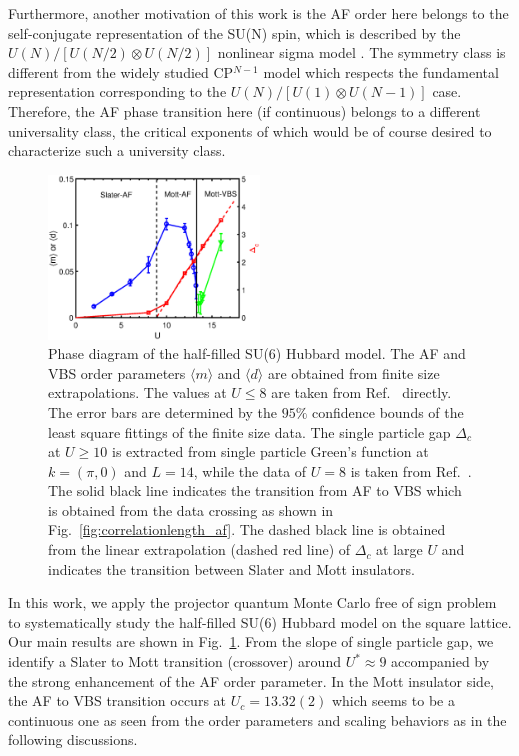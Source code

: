 \documentclass[twocolumn,superscriptaddress,prb]{revtex4-1}
\begin{document}
Furthermore, another motivation of this work is the AF order here belongs to the self-conjugate representation of the SU(N) spin, which is described by the $U(N)/[U(N/2)\otimes U(N/2)]$ nonlinear sigma model \cite{MacFarlane_PLB_1979,Duerksen_PRD_1981,Read_PRL_1989,*Read_NPB_1989,*Read_PRB_1990}. The symmetry class is different from the widely studied CP$^{N-1}$ model which respects the fundamental representation corresponding to the $U(N)/[U(1)\otimes U(N-1)]$ case. Therefore, the AF phase transition here (if continuous) belongs to a different universality class, the critical exponents of which would be of course desired to characterize such a university class.

\begin{figure} [h]
    \includegraphics[width=0.5\textwidth]{phasediagram}
    \caption{\label{fig:phasediagram}Phase diagram of the half-filled SU(6) Hubbard model. The AF and VBS order parameters $\langle m \rangle$ and $\langle d \rangle$ are obtained from finite size extrapolations. The values at $U\le8$ are taken from Ref.~ directly. The error bars are determined by the $95\%$ confidence bounds of the least square fittings of the finite size data. The single particle gap $\Delta_c$ at $U\ge10$ is extracted from single particle Green's function at $k=(\pi,0)$ and $L=14$, while the data of $U=8$ is taken from Ref.~. The solid black line indicates the transition from AF to VBS which is obtained from the data crossing as shown in Fig.~\ref{fig:correlationlength_af}. The dashed black line is obtained from the linear extrapolation (dashed red line) of $\Delta_c$ at large $U$ and indicates the transition between Slater and Mott insulators.}
\end{figure}

In this work, we apply the projector quantum Monte Carlo free of sign problem to systematically study the half-filled SU(6) Hubbard model on the square lattice. Our main results are shown in Fig.~\ref{fig:phasediagram}. From the slope of single particle gap, we identify a Slater to Mott transition (crossover) around $U^*\approx9$ accompanied by the strong enhancement of the AF order parameter. In the Mott insulator side, the AF to VBS transition occurs at $U_c=13.32(2)$ which seems to be a continuous one as seen from the order parameters and scaling behaviors as in the following discussions. 
\end{document}
